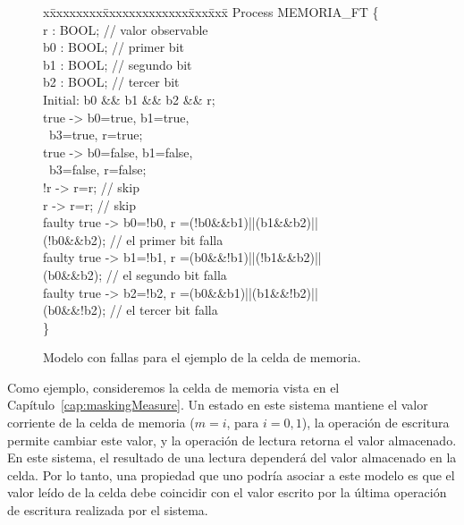 \begin{figure}[t]
\centering
\begin{minipage}[t]{.47\textwidth}
\fontsize{10}{10}\selectfont\ttfamily
\begin{tabbing}
x\=xxxxxxxx\=xxxxxxxxxxxxx\=xxx\=xxx\= \kill    
Process MEMORIA\_FT \{\\[1ex]
\>r : BOOL; // valor observable \\
\>b0 : BOOL; // primer bit \\
\>b1 : BOOL; // segundo bit \\
\>b2 : BOOL; // tercer bit \\[1ex]
\>Initial: b0 \&\& b1 \&\& b2 \&\& r;\\[1ex]
\>[write1]  true -> b0=true, b1=true,  \\
\>\>~b3=true, r=true; \>\> \\
\>[write0]  true -> b0=false, b1=false,  \\
\>\>~b3=false, r=false; \>\> \\
\>[read0]  !r -> r=r; // skip \\
\>[read1]  r ->  r=r; // skip \\
\>[fault1]  faulty true -> b0=!b0, r =(!b0\&\&b1)||(b1\&\&b2)|| \\ 
\>\>(!b0\&\&b2); // el primer bit falla  \\
\>[fault2]  faulty true -> b1=!b1, r =(b0\&\&!b1)||(!b1\&\&b2)|| \\ 
\>\>(b0\&\&b2); // el segundo bit falla  \\
\>[fault3]  faulty true -> b2=!b2, r =(b0\&\&b1)||(b1\&\&!b2)|| \\ 
\>\>(b0\&\&!b2); // el tercer bit falla  \\[1ex]
\}\\
\end{tabbing}
\end{minipage}
\caption{Modelo con fallas para el ejemplo de la celda de memoria.} \label{fig:exam_1_mem_cell_faulty}
\end{figure}

Como ejemplo, consideremos la celda de memoria vista en el Capítulo~\ref{cap:maskingMeasure}. 
Un estado en este sistema mantiene el valor corriente de la celda de memoria ($m=i$, para $i=0,1$), la operación de escritura permite cambiar este valor, y la operación de lectura retorna el valor almacenado.  
En este sistema, el resultado de una lectura dependerá del valor almacenado en la celda. 
Por lo tanto, una propiedad que uno podría asociar a este modelo es que el valor leído de la celda debe coincidir con el valor escrito por la última operación de escritura realizada por el sistema. 
    
